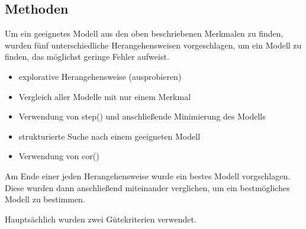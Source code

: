 \subsection{Methoden}
Um ein geeignetes Modell aus den oben beschriebenen Merkmalen zu finden, wurden f\"unf unterschiedliche Herangehensweisen vorgeschlagen, um ein Modell zu finden, das möglichst geringe Fehler aufweist.
\begin{itemize}
	\item explorative Herangehensweise (ausprobieren)
	\item Vergleich aller Modelle mit nur einem Merkmal
	\item Verwendung von step() und anschließende Minimierung des Modells
	\item strukturierte Suche nach einem geeigneten Modell
	\item Verwendung von cor()
\end{itemize}
Am Ende einer jeden Herangehensweise wurde ein bestes Modell vorgschlagen. Diese wurden dann anschließend miteinander verglichen, um ein bestmögliches Modell zu bestimmen.
\par\smallskip

\noindent
Haupts\"achlich wurden zwei G\"utekriterien verwendet.
\par\smallskip


